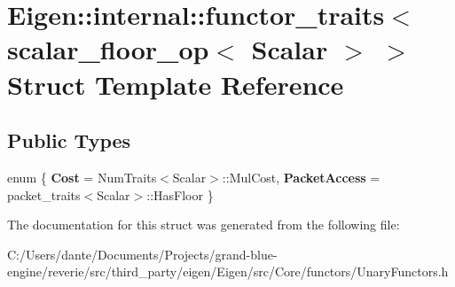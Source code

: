 \hypertarget{struct_eigen_1_1internal_1_1functor__traits_3_01scalar__floor__op_3_01_scalar_01_4_01_4}{}\section{Eigen\+::internal\+::functor\+\_\+traits$<$ scalar\+\_\+floor\+\_\+op$<$ Scalar $>$ $>$ Struct Template Reference}
\label{struct_eigen_1_1internal_1_1functor__traits_3_01scalar__floor__op_3_01_scalar_01_4_01_4}
\subsection*{Public Types}
\begin{DoxyCompactItemize}
\item 
\mbox{\label{struct_eigen_1_1internal_1_1functor__traits_3_01scalar__floor__op_3_01_scalar_01_4_01_4_a3906797d103adcddd24d3c42c43eec05}} 
enum \{ {\bfseries Cost} = Num\+Traits$<$Scalar$>$\+::Mul\+Cost, 
{\bfseries Packet\+Access} = packet\+\_\+traits$<$Scalar$>$\+::Has\+Floor
 \}
\end{DoxyCompactItemize}


The documentation for this struct was generated from the following file\+:\begin{DoxyCompactItemize}
\item 
C\+:/\+Users/dante/\+Documents/\+Projects/grand-\/blue-\/engine/reverie/src/third\+\_\+party/eigen/\+Eigen/src/\+Core/functors/Unary\+Functors.\+h\end{DoxyCompactItemize}
